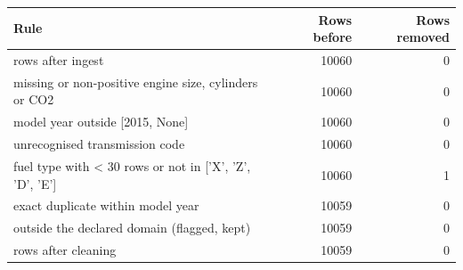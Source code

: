 \begin{tabular}{lrr}
\toprule
Rule & Rows before & Rows removed \\
\midrule
rows after ingest & 10060 & 0 \\
missing or non-positive engine size, cylinders or CO2 & 10060 & 0 \\
model year outside [2015, None] & 10060 & 0 \\
unrecognised transmission code & 10060 & 0 \\
fuel type with < 30 rows or not in ['X', 'Z', 'D', 'E'] & 10060 & 1 \\
exact duplicate within model year & 10059 & 0 \\
outside the declared domain (flagged, kept) & 10059 & 0 \\
rows after cleaning & 10059 & 0 \\
\bottomrule
\end{tabular}
